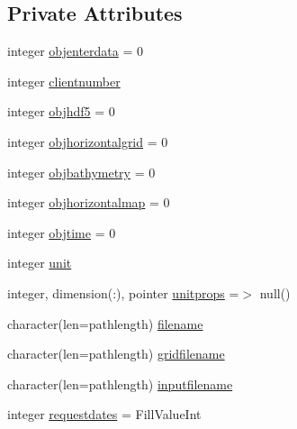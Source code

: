 \subsection*{Private Attributes}
\begin{DoxyCompactItemize}
\item 
integer \mbox{\hyperlink{structmodulehdf5toasciiandbin_1_1t__hdf5toasciiandbin_aec6df5450d9c66ba475753bf0e4dccc2}{objenterdata}} = 0
\item 
integer \mbox{\hyperlink{structmodulehdf5toasciiandbin_1_1t__hdf5toasciiandbin_a299a4e38f0e8bf1056e82644996b500a}{clientnumber}}
\item 
integer \mbox{\hyperlink{structmodulehdf5toasciiandbin_1_1t__hdf5toasciiandbin_a5be0fa061b946ba9a9a78f4e38e9396c}{objhdf5}} = 0
\item 
integer \mbox{\hyperlink{structmodulehdf5toasciiandbin_1_1t__hdf5toasciiandbin_a95a5ee7ed2286dd6f47f25f22bde02ff}{objhorizontalgrid}} = 0
\item 
integer \mbox{\hyperlink{structmodulehdf5toasciiandbin_1_1t__hdf5toasciiandbin_a96e4a44eb7b768b33237970ca35a7558}{objbathymetry}} = 0
\item 
integer \mbox{\hyperlink{structmodulehdf5toasciiandbin_1_1t__hdf5toasciiandbin_acf2da269141704a9f8d208db76232e04}{objhorizontalmap}} = 0
\item 
integer \mbox{\hyperlink{structmodulehdf5toasciiandbin_1_1t__hdf5toasciiandbin_ae436e52a621928d0c93472ae2ebdc600}{objtime}} = 0
\item 
integer \mbox{\hyperlink{structmodulehdf5toasciiandbin_1_1t__hdf5toasciiandbin_a784e86c5574c1ae86c95579e06ae8dbf}{unit}}
\item 
integer, dimension(\+:), pointer \mbox{\hyperlink{structmodulehdf5toasciiandbin_1_1t__hdf5toasciiandbin_a3989cd1710be5e5f119ed8cdd1425fd0}{unitprops}} =$>$ null()
\item 
character(len=pathlength) \mbox{\hyperlink{structmodulehdf5toasciiandbin_1_1t__hdf5toasciiandbin_a44cf5a3e7167c0c8ccf4cd74af5c39a8}{filename}}
\item 
character(len=pathlength) \mbox{\hyperlink{structmodulehdf5toasciiandbin_1_1t__hdf5toasciiandbin_ab84ffdf2ab3e0961635dbc41725a41f5}{gridfilename}}
\item 
character(len=pathlength) \mbox{\hyperlink{structmodulehdf5toasciiandbin_1_1t__hdf5toasciiandbin_ac0c61b7d49eb0bccdaca1f9853ef149e}{inputfilename}}
\item 
integer \mbox{\hyperlink{structmodulehdf5toasciiandbin_1_1t__hdf5toasciiandbin_a9627c6a5be3db31254de37442d85fb7e}{requestdates}} = Fill\+Value\+Int

\end{DoxyCompactItemize}
